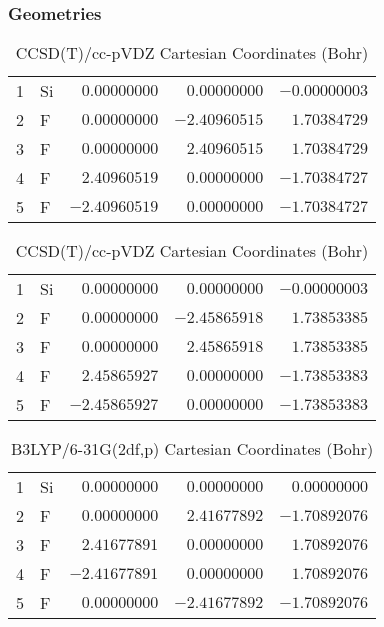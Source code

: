 \documentclass[10pt,oneside]{article}
\begin{document}
\begin{table}[h!]
\subsubsection*{Geometries}
\begin{multicols}{2}
\centering
\caption{CCSD(T)/cc-pVTZ Cartesian Coordinates (Bohr)}
\begin{tabular}{llrrr}
\toprule
1  & Si & $ 0.00000000$ & $ 0.00000000$ & $-0.00000003$ \\
2  & F  & $ 0.00000000$ & $-2.40960515$ & $ 1.70384729$ \\
3  & F  & $ 0.00000000$ & $ 2.40960515$ & $ 1.70384729$ \\
4  & F  & $ 2.40960519$ & $ 0.00000000$ & $-1.70384727$ \\
5  & F  & $-2.40960519$ & $ 0.00000000$ & $-1.70384727$ \\
\bottomrule
\end{tabular}
\caption{CCSD(T)/cc-pVDZ Cartesian Coordinates (Bohr)}
\begin{tabular}{llrrr}
\toprule
1  & Si & $ 0.00000000$ & $ 0.00000000$ & $-0.00000003$ \\
2  & F  & $ 0.00000000$ & $-2.45865918$ & $ 1.73853385$ \\
3  & F  & $ 0.00000000$ & $ 2.45865918$ & $ 1.73853385$ \\
4  & F  & $ 2.45865927$ & $ 0.00000000$ & $-1.73853383$ \\
5  & F  & $-2.45865927$ & $ 0.00000000$ & $-1.73853383$ \\
\bottomrule
\end{tabular}
\end{multicols}
\end{table}

\begin{table}[h]
\centering
\caption{B3LYP/6-31G(2df,p) Cartesian Coordinates (Bohr)}
\begin{tabular}{llrrr}
\toprule
1  & Si & $ 0.00000000$ & $ 0.00000000$ & $ 0.00000000$ \\
2  & F  & $ 0.00000000$ & $ 2.41677892$ & $-1.70892076$ \\
3  & F  & $ 2.41677891$ & $ 0.00000000$ & $ 1.70892076$ \\
4  & F  & $-2.41677891$ & $ 0.00000000$ & $ 1.70892076$ \\
5  & F  & $ 0.00000000$ & $-2.41677892$ & $-1.70892076$ \\
\bottomrule
\end{tabular}
\end{table}
\end{document}
